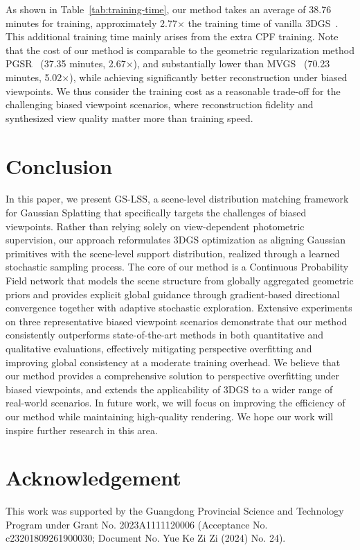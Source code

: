 \documentclass[lettersize,journal]{IEEEtran}
\begin{document}
As shown in Table~\ref{tab:training-time}, our method takes an average of 38.76 minutes for training, approximately 2.77$\times$ the training time of vanilla 3DGS~\cite{3dgs}.
This additional training time mainly arises from the extra CPF training. 
Note that the cost of our method is comparable to the geometric regularization method PGSR~\cite{pgsr} (37.35 minutes, 2.67$\times$), and substantially lower than MVGS~\cite{mvgs} (70.23 minutes, 5.02$\times$), while achieving significantly better reconstruction under biased viewpoints. 
We thus consider the training cost as a reasonable trade-off for the challenging biased viewpoint scenarios, where reconstruction fidelity and synthesized view quality matter more than training speed.



\section{Conclusion}

In this paper, we present GS-LSS, a scene-level distribution matching framework for Gaussian Splatting that specifically targets the challenges of biased viewpoints. Rather than relying solely on view-dependent photometric supervision, our approach reformulates 3DGS optimization as aligning Gaussian primitives with the scene-level support distribution, realized through a learned stochastic sampling process.
The core of our method is a Continuous Probability Field network that models the scene structure from globally aggregated geometric priors and provides explicit global guidance through gradient-based directional convergence together with adaptive stochastic exploration. 
Extensive experiments on three representative biased viewpoint scenarios demonstrate that our method consistently outperforms state-of-the-art methods in both quantitative and qualitative evaluations, effectively mitigating perspective overfitting and improving global consistency at a moderate training overhead.
We believe that our method provides a comprehensive solution to perspective overfitting under biased viewpoints, and extends the applicability of 3DGS to a wider range of real-world scenarios. In future work, we will focus on improving the efficiency of our method while maintaining high-quality rendering. We hope our work will inspire further research in this area.

\section*{Acknowledgement}
This work was supported by the Guangdong Provincial Science and Technology Program under Grant No. 2023A1111120006 (Acceptance No. c23201809261900030; Document No. Yue Ke Zi Zi (2024) No. 24).




\vfill
\end{document}
